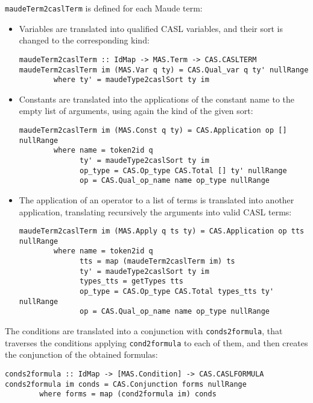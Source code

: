 \verb"maudeTerm2caslTerm" is defined for each Maude term:

\begin{itemize}

\item Variables are translated into qualified CASL variables, and their
sort is changed to the corresponding kind:

{\codesize
\begin{verbatim}
maudeTerm2caslTerm :: IdMap -> MAS.Term -> CAS.CASLTERM
maudeTerm2caslTerm im (MAS.Var q ty) = CAS.Qual_var q ty' nullRange
        where ty' = maudeType2caslSort ty im
\end{verbatim}
}

\item Constants are translated into the applications of the constant
name to the empty list of arguments, using again the kind of the
given sort:

{\codesize
\begin{verbatim}
maudeTerm2caslTerm im (MAS.Const q ty) = CAS.Application op [] nullRange
        where name = token2id q
              ty' = maudeType2caslSort ty im
              op_type = CAS.Op_type CAS.Total [] ty' nullRange
              op = CAS.Qual_op_name name op_type nullRange
\end{verbatim}
}

\item The application of an operator to a list of terms is translated
into another application, translating recursively the arguments into
valid CASL terms:

{\codesize
\begin{verbatim}
maudeTerm2caslTerm im (MAS.Apply q ts ty) = CAS.Application op tts nullRange
        where name = token2id q
              tts = map (maudeTerm2caslTerm im) ts
              ty' = maudeType2caslSort ty im
              types_tts = getTypes tts
              op_type = CAS.Op_type CAS.Total types_tts ty' nullRange
              op = CAS.Qual_op_name name op_type nullRange
\end{verbatim}
}

\end{itemize}

The conditions are translated into a conjunction with \verb"conds2formula",
that traverses the conditions applying \verb"cond2formula" to each of them,
and then creates the conjunction of the obtained formulas:

{\codesize
\begin{verbatim}
conds2formula :: IdMap -> [MAS.Condition] -> CAS.CASLFORMULA
conds2formula im conds = CAS.Conjunction forms nullRange
        where forms = map (cond2formula im) conds
\end{verbatim}
}

